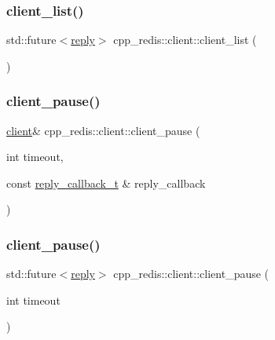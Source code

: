 \mbox{\label{classcpp__redis_1_1client_a0480140cc584e6dd2a0a6fab9da10cc5}} 
\subsubsection{\texorpdfstring{client\+\_\+list()}{client\_list()}\hspace{0.1cm}{\footnotesize\ttfamily [2/2]}}
{\footnotesize\ttfamily std\+::future$<$\hyperlink{classcpp__redis_1_1reply}{reply}$>$ cpp\+\_\+redis\+::client\+::client\+\_\+list (\begin{DoxyParamCaption}{ }\end{DoxyParamCaption})}

\mbox{\label{classcpp__redis_1_1client_acdf001d60d1d82d3f090b7c679e3183e}} 
\subsubsection{\texorpdfstring{client\+\_\+pause()}{client\_pause()}\hspace{0.1cm}{\footnotesize\ttfamily [1/2]}}
{\footnotesize\ttfamily \hyperlink{classcpp__redis_1_1client}{client}\& cpp\+\_\+redis\+::client\+::client\+\_\+pause (\begin{DoxyParamCaption}\item[{int}]{timeout,  }\item[{const \hyperlink{classcpp__redis_1_1client_a061a1140d36d2eaeda82b09a0bb3f9f2}{reply\+\_\+callback\+\_\+t} \&}]{reply\+\_\+callback }\end{DoxyParamCaption})}

\mbox{\label{classcpp__redis_1_1client_a2c73a6f9b2e3f1a0afbaca9fddd29199}} 
\subsubsection{\texorpdfstring{client\+\_\+pause()}{client\_pause()}\hspace{0.1cm}{\footnotesize\ttfamily [2/2]}}
{\footnotesize\ttfamily std\+::future$<$\hyperlink{classcpp__redis_1_1reply}{reply}$>$ cpp\+\_\+redis\+::client\+::client\+\_\+pause (\begin{DoxyParamCaption}\item[{int}]{timeout }\end{DoxyParamCaption})}

